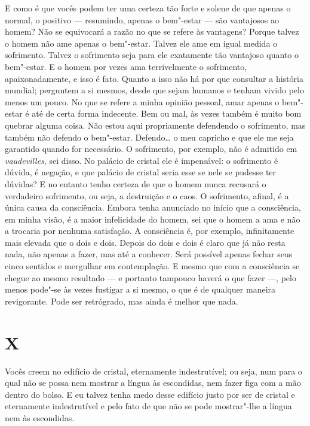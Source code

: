 E como é que vocês podem ter uma certeza tão forte e solene de que
apenas o normal, o positivo --- resumindo, apenas o bem"-estar --- são
vantajosos ao homem? Não se equivocará a razão no que se refere às
vantagens? Porque talvez o homem não ame apenas o bem"-estar. Talvez ele
ame em igual medida o sofrimento. Talvez o sofrimento seja para ele
exatamente tão vantajoso quanto o bem"-estar. E o homem por vezes ama
terrivelmente o sofrimento, apaixonadamente, e isso é fato. Quanto a
isso não há por que consultar a história mundial; perguntem a si
mesmos, desde que sejam humanos e tenham vivido pelo menos um pouco. No
que se refere a minha opinião pessoal, amar apenas o bem"-estar é até de
certa forma indecente. Bem ou mal, às vezes também é muito bom quebrar
alguma coisa. Não estou aqui propriamente defendendo o sofrimento, mas
também não defendo o bem"-estar. Defendo\ldots{} o meu capricho e que ele me
seja garantido quando for necessário. O sofrimento, por exemplo, não é
admitido em \textit{vaudevilles}, sei disso. No palácio de cristal ele
é impensável: o sofrimento é dúvida, é negação, e que palácio de
cristal seria esse se nele se pudesse ter dúvidas? E no entanto tenho
certeza de que o homem nunca recusará o verdadeiro sofrimento, ou seja,
a destruição e o caos. O sofrimento, afinal, é a única causa da
consciência. Embora tenha anunciado no início que a consciência, em
minha visão, é a maior infelicidade do homem, sei que o homem a ama e
não a trocaria por nenhuma satisfação. A consciência é, por exemplo,
infinitamente mais elevada que o dois e dois. Depois do dois e dois é
claro que já não resta nada, não apenas a fazer, mas até a conhecer.
Será possível apenas fechar seus cinco sentidos e mergulhar em
contemplação. E mesmo que com a consciência se chegue ao mesmo
resultado --- e portanto tampouco haverá o que fazer ---, pelo menos
pode"-se às vezes fustigar a si mesmo, o que é de qualquer maneira
revigorante. Pode ser retrógrado, mas ainda é melhor que nada.


\section{X}

Vocês creem no edifício de cristal, eternamente indestrutível; ou seja,
num para o qual não se possa nem mostrar a língua às escondidas, nem
fazer figa com a mão dentro do bolso. E eu talvez tenha medo desse
edifício justo por ser de cristal e eternamente indestrutível e pelo
fato de que não se pode mostrar"-lhe a língua nem às escondidas.

